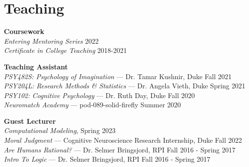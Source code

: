 \section{Teaching}
\textbf{Coursework} \\
\emph{Entering Mentoring Series} \hfill 2022 \\
\emph{Certificate in College Teaching} \hfill 2018-2021

\textbf{Teaching Assistant} \\
\emph{PSY482S: Psychology of Imagination} --- Dr. Tamar Kushnir, Duke \hfill Fall 2021 \\
\emph{PSY204L: Research Methods \& Statistics} --- Dr. Angela Vieth, Duke \hfill Spring 2021 \\
\emph{PSY102: Cognitive Psychology} --- Dr. Ruth Day, Duke  \hfill Fall 2020 \\
\emph{Neuromatch Academy} --- pod-089-solid-firefly \hfill Summer 2020

\textbf{Guest Lecturer} \\
\emph{Computational Modeling},  \hfill Spring 2023 \\
\emph{Moral Judgment} --- Cognitive Neuroscience Research Internship, Duke \hfill Fall 2022 \\
\emph{Are Humans Rational?} --- Dr. Selmer Bringsjord, RPI \hfill Fall 2016 - Spring 2017 \\
\emph{Intro To Logic} --- Dr. Selmer Bringsjord, RPI \hfill Fall 2016 - Spring 2017
